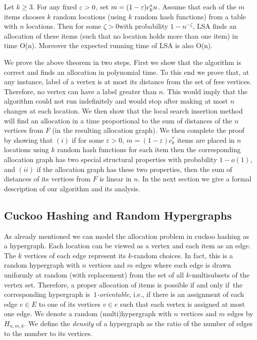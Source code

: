 \begin{theorem}\label{thm:main}
Let $k\ge 3$. For any fixed $\varepsilon >0$, set $m=(1-\varepsilon) c_k^* n$.  Assume that each of the $m$ items chooses $k$ random locations (using $k$ random hash functions) from a table with $n$ locations. Then for some $\zeta>0$with probability $1-n^{-\zeta}$, LSA finds an allocation of these items (such that no location holds more than one item) in time O(n). Moreover the expected running time of LSA is also O(n).
\end{theorem}
We prove the above theorem in two steps. First we show that the algorithm is correct and finds an allocation in polynomial time. To this end we prove that, at any instance, label of a vertex is at most its distance from the set of free vertices. Therefore, no vertex can have a label greater than $n$. This would imply that the algorithm could not run indefinitely and would stop after making at most $n$ changes at each location. 
We then show that the local search insertion method will find an allocation in a time proportional to the sum of distances of the $n$ vertices from $F$ (in the resulting allocation graph). 
We then complete the proof by showing that  $(i)$ if for some $\varepsilon >0$, $m=(1-\varepsilon)c^*_k$ items are placed in $n$ locations using $k$ random hash functions for each item then the corresponding allocation graph has two special structural properties with probability $1-o(1)$, and $(ii)$ if  the allocation graph has these two properties, then the sum of distances of its vertices from $F$ is linear in $n$. In the next section we give a formal description of our algorithm and its analysis.
\subsection*{Cuckoo Hashing and Random Hypergraphs}
As already mentioned we can model the allocation problem in cuckoo hashing as a hypergraph. Each location can be viewed as a vertex and each item as an edge. The $k$ vertices of each edge represent its $k$-random choices. In fact, this is a random hypergraph  with $n$ vertices and $m$ edges where each edge is drawn uniformly at random (with replacement) from the set of all $k$-multisubsets of the vertex set.
Therefore, a proper allocation of items is possible if and only if~the corresponding hypergraph is~\emph{$1$-orientable}, i.e., if there is an assignment of each edge $e\in E$ to one of its vertices $v\in e$ such that each vertex is assigned at most one edge. We denote a random (multi)hypergraph with $n$ vertices and $m$ edges by $H_{n,m,k}$.
We define the \emph{density} of a hypergraph as the ratio of the number of edges to the number to its vertices.

